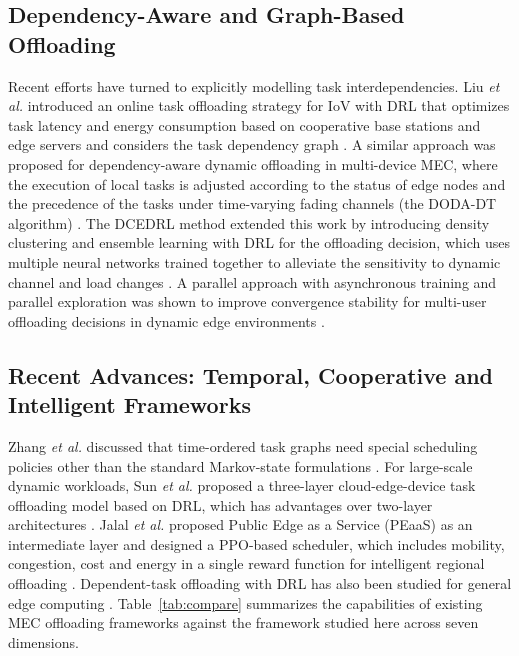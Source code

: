 \documentclass{ieeeaccess}
\begin{document}
\subsection{Dependency-Aware and Graph-Based Offloading}
Recent efforts have turned to explicitly modelling task interdependencies. Liu \emph{et al.} introduced an online task offloading strategy for IoV with DRL that optimizes task latency and energy consumption based on cooperative base stations and edge servers and considers the task dependency graph \cite{liu2024dep}. A similar approach was proposed for dependency-aware dynamic offloading in multi-device MEC, where the execution of local tasks is adjusted according to the status of edge nodes and the precedence of the tasks under time-varying fading channels (the DODA-DT algorithm) \cite{fang2024}. The DCEDRL method extended this work by introducing density clustering and ensemble learning with DRL for the offloading decision, which uses multiple neural networks trained together to alleviate the sensitivity to dynamic channel and load changes \cite{qin2025}. A parallel approach with asynchronous training and parallel exploration was shown to improve convergence stability for multi-user offloading decisions in dynamic edge environments \cite{chen2025mon}.

\subsection{Recent Advances: Temporal, Cooperative and Intelligent Frameworks}
Zhang \emph{et al.} discussed that time-ordered task graphs need special scheduling policies other than the standard Markov-state formulations \cite{zhang2025}. For large-scale dynamic workloads, Sun \emph{et al.} proposed a three-layer cloud-edge-device task offloading model based on DRL, which has advantages over two-layer architectures \cite{sun2026}. Jalal \emph{et al.} proposed Public Edge as a Service (PEaaS) as an intermediate layer and designed a PPO-based scheduler, which includes mobility, congestion, cost and energy in a single reward function for intelligent regional offloading \cite{jalal2026}. Dependent-task offloading with DRL has also been studied for general edge computing \cite{wang2022dep}. Table~\ref{tab:compare} summarizes the capabilities of existing MEC offloading frameworks against the framework studied here across seven dimensions.
\end{document}
